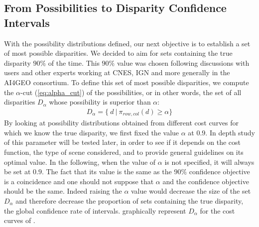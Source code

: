 \subsection{From Possibilities to Disparity Confidence Intervals}
With the possibility distributions defined, our next objective is to establish a set of most possible disparities. We decided to aim for sets containing the true disparity $90\%$ of the time. This \( 90\%\) value was chosen following discussions with users and other experts working at CNES, IGN and more generally in the AI4GEO consortium. To define this set of most possible disparities, we compute the $\alpha$-cut (\cref{eq:alpha_cut}) of the possibilities, or in other words, the set of all disparities $D_\alpha$ whose possibility is superior than $\alpha$:
\begin{align}
    D_\alpha=\{~ d ~|~ \pi_{row,col}(d)\geqslant\alpha\}\label{eq:set_of_possible_disparities}
\end{align}
By looking at possibility distributions obtained from different cost curves for which we know the true disparity, we first fixed the value $\alpha$ at $0.9$. In depth study of this parameter will be tested later, in order to see if it depends on the cost function, the type of scene considered, and to provide general guidelines on its optimal value. In the following, when the value of $\alpha$ is not specified, it will always be set at $0.9$. The fact that its value is the same as the $90\%$ confidence objective is a coincidence and one should not suppose that $\alpha$ and the confidence objective should be the same. Indeed raising the $\alpha$ value would decrease the size of the set $D_\alpha$ and therefore decrease the proportion of sets containing the true disparity, \ie the global confidence rate of intervals.  graphically represent $D_\alpha$ for the cost curves of .

